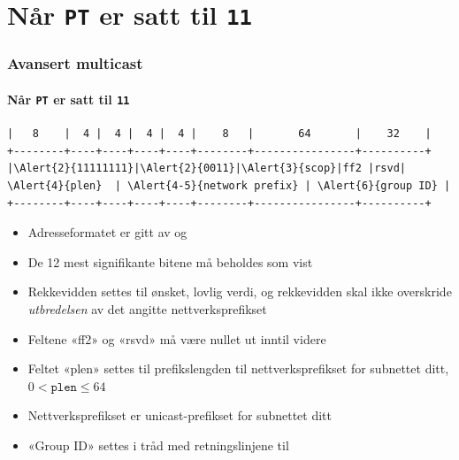 \section{Når \texttt{PT} er satt til \texttt{11}}
\begin{frame}[fragile]
  \frametitle{Avansert multicast}
  \framesubtitle{Når \texttt{PT} er satt til \texttt{11}}
\begin{Verbatim}[commandchars=\\\{\},fontsize=\tiny]
|   8    |  4 |  4 |  4 |  4 |    8   |       64       |    32    |
+--------+----+----+----+----+--------+----------------+----------+
|\Alert{2}{11111111}|\Alert{2}{0011}|\Alert{3}{scop}|ff2 |rsvd|  \Alert{4}{plen}  | \Alert{4-5}{network prefix} | \Alert{6}{group ID} |
+--------+----+----+----+----+--------+----------------+----------+
\end{Verbatim}
  \begin{itemize}
  \item Adresseformatet er gitt av  og 
  \item \alert<2>{De 12 mest signifikante bitene} må beholdes som vist
  \item \alert<3>{Rekkevidden} settes til ønsket, lovlig verdi, og
    rekkevidden skal ikke overskride \textit{utbredelsen\/} av det
    angitte nettverksprefikset
  \item Feltene «ff2» og «rsvd» må være nullet ut inntil videre
  \item Feltet «plen» settes til \alert<4>{prefikslengden til
      nettverksprefikset for subnettet ditt}, \(0<\mathtt{plen}\le64\)
  \item \alert<5>{Nettverksprefikset} er unicast-prefikset for
    subnettet ditt
  \item \alert<6>{«Group ID»} settes i tråd med retningslinjene til 
  \end{itemize}
\end{frame}

